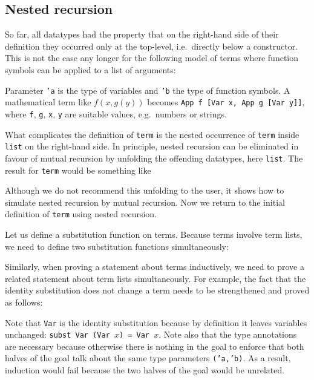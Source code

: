 \subsection{Nested recursion}

So far, all datatypes had the property that on the right-hand side of their
definition they occurred only at the top-level, i.e.\ directly below a
constructor. This is not the case any longer for the following model of terms
where function symbols can be applied to a list of arguments:
\begin{ttbox}
\end{ttbox}
Parameter \texttt{'a} is the type of variables and \texttt{'b} the type of
function symbols.
A mathematical term like $f(x,g(y))$ becomes \texttt{App f [Var x, App g
  [Var y]]}, where \texttt{f}, \texttt{g}, \texttt{x}, \texttt{y} are
suitable values, e.g.\ numbers or strings.

What complicates the definition of \texttt{term} is the nested occurrence of
\texttt{term} inside \texttt{list} on the right-hand side. In principle,
nested recursion can be eliminated in favour of mutual recursion by unfolding
the offending datatypes, here \texttt{list}. The result for \texttt{term}
would be something like
\begin{ttbox}
\end{ttbox}
Although we do not recommend this unfolding to the user, it shows how to
simulate nested recursion by mutual recursion.
Now we return to the initial definition of \texttt{term} using
nested recursion.

Let us define a substitution function on terms. Because terms involve term
lists, we need to define two substitution functions simultaneously:
\begin{ttbox}


\end{ttbox}
Similarly, when proving a statement about terms inductively, we need
to prove a related statement about term lists simultaneously. For example,
the fact that the identity substitution does not change a term needs to be
strengthened and proved as follows:
\begin{quote}\small

\end{quote}
Note that \texttt{Var} is the identity substitution because by definition it
leaves variables unchanged: \texttt{subst Var (Var $x$) = Var $x$}. Note also
that the type annotations are necessary because otherwise there is nothing in
the goal to enforce that both halves of the goal talk about the same type
parameters \texttt{('a,'b)}. As a result, induction would fail
because the two halves of the goal would be unrelated.

